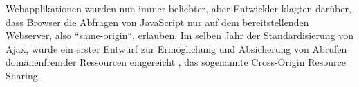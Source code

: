 Webapplikationen wurden nun immer beliebter, aber Entwickler klagten darüber, dass Browser die Abfragen von JavaScript nur auf dem bereitstellenden Webserver, also ``same-origin``, erlauben\cite{CrossSiteXHRWithCORS}. Im selben Jahr der Standardisierung von Ajax, wurde ein erster Entwurf zur Ermöglichung und Absicherung von Abrufen domänenfremder Ressourcen eingereicht \cite{AuthorizingCORS}, das sogenannte Cross-Origin Resource Sharing.


%
